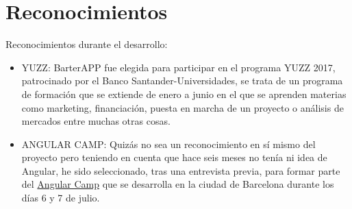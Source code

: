    
   \section{Reconocimientos}\label{reconocimientos}
   
   Reconocimientos durante el desarrollo:
   
   \begin{itemize}
	\item YUZZ: BarterAPP fue elegida para participar en el programa YUZZ 2017, patrocinado por el Banco Santander-Universidades, se trata de un programa de formación que se extiende de enero a junio en el que se aprenden materias como marketing, financiación, puesta en marcha de un proyecto o análisis de mercados entre muchas otras cosas. 
	\item ANGULAR CAMP: Quizás no sea un reconocimiento en sí mismo del proyecto pero teniendo en cuenta que hace seis meses no tenía ni idea de Angular, he sido seleccionado, tras una entrevista previa, para formar parte del  \href{https://angularcamp.org/}{Angular Camp} que se desarrolla en la ciudad de Barcelona durante los días 6 y 7 de julio.
\end{itemize}


 
 